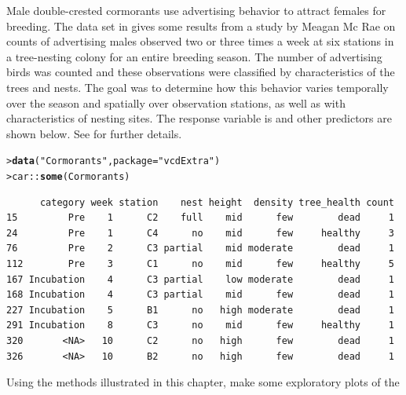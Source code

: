 \documentclass[11pt]{report}\usepackage[]{graphicx}\usepackage[]{color}
\makeatletter
\newcommand{\hlstr}[1]{\textcolor[rgb]{0.192,0.494,0.8}{#1}}%
\newcommand{\hlopt}[1]{\textcolor[rgb]{0,0,0}{#1}}%
\newcommand{\hlstd}[1]{\textcolor[rgb]{0.345,0.345,0.345}{#1}}%
\newcommand{\hlkwc}[1]{\textcolor[rgb]{0.333,0.667,0.333}{#1}}%
\newcommand{\hlkwd}[1]{\textcolor[rgb]{0.737,0.353,0.396}{\textbf{#1}}}%
\newenvironment{kframe}{%
 \def\at@end@of@kframe{}%
 \ifinner\ifhmode%
  \def\at@end@of@kframe{\end{minipage}}%
  \begin{minipage}{\columnwidth}%
 \fi\fi%
 \def\FrameCommand##1{\hskip\@totalleftmargin \hskip-\fboxsep
 \colorbox{shadecolor}{##1}\hskip-\fboxsep
     \hskip-\linewidth \hskip-\@totalleftmargin \hskip\columnwidth}%
 \MakeFramed {\advance\hsize-\width
   \@totalleftmargin\z@ \linewidth\hsize
   \@setminipage}}%
 {\par\unskip\endMakeFramed%
 \at@end@of@kframe}
\newenvironment{knitrout}{}{} %
\renewenvironment{knitrout}{\small\renewcommand{\baselinestretch}{.85}}{} %
\makeatother
\begin{document}
\begin{Exercises}
  \exercise Male double-crested cormorants use advertising behavior to attract females for breeding.
	The  data set in  gives some results from a study by
	Meagan Mc Rae \citeyearpar{McRae:2015} on counts of advertising males observed two or three times a week
	at six stations in a tree-nesting colony for an entire breeding season.
	The number of advertising birds was counted and these observations were classified
	by characteristics of the trees and nests. The goal was to determine how this behavior varies 
	temporally over the season and spatially over observation stations, as well as with 
	characteristics of nesting sites.
	The response variable is 
	and other predictors are shown below.  See 
	for further details.
\begin{knitrout}
\color{fgcolor}\begin{kframe}
\begin{alltt}
\hlstd{> }\hlkwd{data}\hlstd{(}\hlstr{"Cormorants"}\hlstd{,} \hlkwc{package} \hlstd{=} \hlstr{"vcdExtra"}\hlstd{)}
\hlstd{> }\hlstd{car}\hlopt{::}\hlkwd{some}\hlstd{(Cormorants)}
\end{alltt}
\begin{verbatim}
      category week station    nest height  density tree_health count
15         Pre    1      C2    full    mid      few        dead     1
24         Pre    1      C4      no    mid      few     healthy     3
76         Pre    2      C3 partial    mid moderate        dead     1
112        Pre    3      C1      no    mid      few     healthy     5
167 Incubation    4      C3 partial    low moderate        dead     1
168 Incubation    4      C3 partial    mid      few        dead     1
227 Incubation    5      B1      no   high moderate        dead     1
291 Incubation    8      C3      no    mid      few     healthy     1
320       <NA>   10      C2      no   high      few        dead     1
326       <NA>   10      B2      no   high      few        dead     1
\end{verbatim}
\end{kframe}
\end{knitrout}
	\begin{enumerate*}
		\item Using the methods illustrated in this chapter, make some exploratory plots of the

\end{enumerate*}
\end{Exercises}
\end{document}

